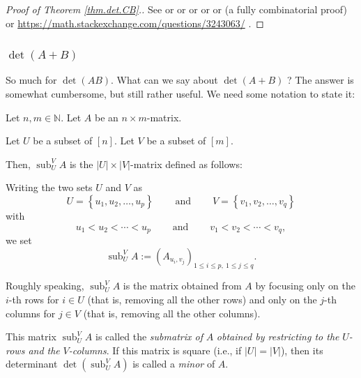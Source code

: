 \begin{proof}
[Proof of Theorem \ref{thm.det.CB}.]See \cite[Theorem 6.32]{detnotes} or
\cite{Schwar16} or \cite[\S 1.2.3, Exercise 46]{Knuth-TAoCP1} or \cite[Theorem
9.53]{Loehr-BC} or \cite[Theorem 9.4]{Stanle18} or \cite[\S 2]{Zeng93} (a
fully combinatorial proof) or
\url{https://math.stackexchange.com/questions/3243063/} .
\end{proof}

\subsubsection{$\det\left(  A+B\right)  $}

So much for $\det\left(  AB\right)  $. What can we say about $\det\left(
A+B\right)  $ ? The answer is somewhat cumbersome, but still rather useful. We
need some notation to state it:

\begin{definition}
\label{def.det.sub}Let $n,m\in\mathbb{N}$. Let $A$ be an $n\times m$-matrix.

Let $U$ be a subset of $\left[  n\right]  $. Let $V$ be a subset of $\left[
m\right]  $.

Then, $\operatorname*{sub}\nolimits_{U}^{V}A$ is the $\left\vert U\right\vert
\times\left\vert V\right\vert $-matrix defined as follows:

Writing the two sets $U$ and $V$ as%
\[
U=\left\{  u_{1},u_{2},\ldots,u_{p}\right\}  \ \ \ \ \ \ \ \ \ \ \text{and}%
\ \ \ \ \ \ \ \ \ \ V=\left\{  v_{1},v_{2},\ldots,v_{q}\right\}
\]
with
\[
u_{1}<u_{2}<\cdots<u_{p}\ \ \ \ \ \ \ \ \ \ \text{and}%
\ \ \ \ \ \ \ \ \ \ v_{1}<v_{2}<\cdots<v_{q},
\]
we set%
\[
\operatorname*{sub}\nolimits_{U}^{V}A:=\left(  A_{u_{i},v_{j}}\right)  _{1\leq
i\leq p,\ 1\leq j\leq q}.
\]


Roughly speaking, $\operatorname*{sub}\nolimits_{U}^{V}A$ is the matrix
obtained from $A$ by focusing only on the $i$-th rows for $i\in U$ (that is,
removing all the other rows) and only on the $j$-th columns for $j\in V$ (that
is, removing all the other columns).

This matrix $\operatorname*{sub}\nolimits_{U}^{V}A$ is called the
\emph{submatrix of }$A$\emph{ obtained by restricting to the }$U$\emph{-rows
and the }$V$\emph{-columns}. If this matrix is square (i.e., if $\left\vert
U\right\vert =\left\vert V\right\vert $), then its determinant $\det\left(
\operatorname*{sub}\nolimits_{U}^{V}A\right)  $ is called a \emph{minor} of
$A$.
\end{definition}

